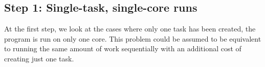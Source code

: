 \vspace{\baselineskip}
%
\vspace{\baselineskip}
\vspace{\baselineskip}
\vspace{\baselineskip}
\vspace{\baselineskip}
\vspace{\baselineskip}
\vspace{\baselineskip}
\vspace{\baselineskip}
\vspace{\baselineskip}
\vspace{\baselineskip}
\vspace{\baselineskip}
\vspace{\baselineskip}


\subsection{Step 1: Single-task, single-core runs}
At the first step, we look at the cases where only one task has been created, the program is run on only one core. This problem could be assumed to be equivalent to running the same amount of work sequentially with an additional cost of creating just one task. 

\vspace{\baselineskip}
\vspace{\baselineskip}
\vspace{\baselineskip}
\vspace{\baselineskip}
\vspace{\baselineskip}
\vspace{\baselineskip}
\vspace{\baselineskip}
\vspace{\baselineskip}
\vspace{\baselineskip}
\vspace{\baselineskip}
\vspace{\baselineskip}









